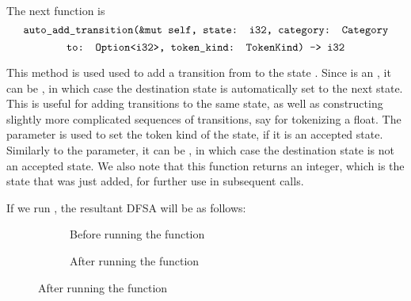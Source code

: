 The next function is $$\texttt{auto\_add\_transition(\&mut self, state: i32,
        category: Category}$$
$$\texttt{to: Option<i32>, token\_kind: TokenKind) -> i32}$$

This method is used used to add a transition from  to
the state . Since  is an , it can be ,
in which case the destination state is automatically set to the next state. This
is useful for adding transitions to the same state, as well as constructing
slightly more complicated sequences of transitions, say for tokenizing a float.
The  parameter is used to set the token kind of the state, if
it is an accepted state. Similarly to the  parameter, it can be
, in which case the destination state is not an accepted state.  We
also note that this function returns an integer, which is the state that was
just added, for further use in subsequent calls.

If we run , the resultant DFSA will be as follows:

\begin{figure}[H]
    \begin{subfigure}[t]{0.5\textwidth}
        \centering
        \caption{Before running the function}
    \end{subfigure}
    \begin{subfigure}[t]{0.5\textwidth}
        \centering
        \caption{After running the function}
    \end{subfigure}
\end{figure}

